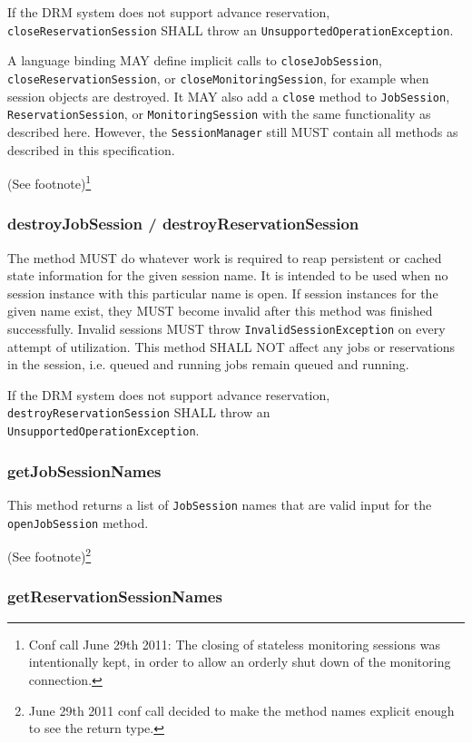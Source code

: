 \documentclass{article}
\newcommand{\h}[1]{\lstinline|#1|}
\newcommand{\langbind}[1]{\begin{shaded}#1\end{shaded}}
\newcommand{\rat}[1]{ {\tiny(See footnote)}\footnote{#1} }
\begin{document}
If the DRM system does not support advance reservation, \h{closeReservationSession} SHALL throw an \h{UnsupportedOperationException}.

\langbind{
A language binding MAY define implicit calls to \h{closeJobSession}, \h{closeReservationSession}, or \h{closeMonitoringSession}, for example when session objects are destroyed. It MAY also add a \h{close} method to \h{JobSession},  \h{ReservationSession}, or \h{MonitoringSession} with the same functionality as described here. However, the \h{SessionManager} still MUST contain all methods as described in this specification.
}

\rat{Conf call June 29th 2011: The closing of stateless monitoring sessions was intentionally kept, in order to allow an orderly shut down of the monitoring connection.}

\subsubsection{destroyJobSession / destroyReservationSession}

The method MUST do whatever work is required to reap persistent or cached state information for the given session name. It is intended to be used when no session instance with this particular name is open. If session instances for the given name exist, they MUST become invalid after this method was finished successfully. Invalid sessions MUST throw \h{InvalidSessionException} on every attempt of utilization. This method SHALL NOT affect any jobs or reservations in the session, i.e. queued and running jobs remain queued and running. 

If the DRM system does not support advance reservation, \h{destroyReservationSession} SHALL throw an \h{UnsupportedOperationException}.

\subsubsection{getJobSessionNames}

This method returns a list of \h{JobSession} names that are valid input for the \h{openJobSession} method.

\rat{June 29th 2011 conf call decided to make the method names explicit enough to see the return type.}

\subsubsection{getReservationSessionNames}
\end{document}
